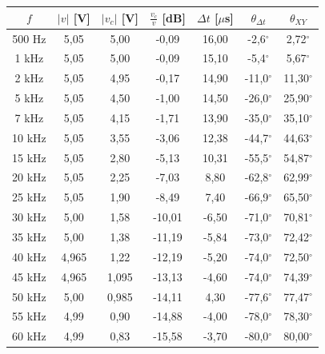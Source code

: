 \documentclass{article}
\begin{document}
\begin{table}[H]
                    \centering
                    \renewcommand{\arraystretch}{1.1}
                    \begin{tabular}{ccccccc}
                    \toprule
                    \textbf{$f$} & \textbf{$|v|$ [V]} & \textbf{$|v_c|$ [V]} & \textbf{$\frac{v_c}{v}$ [dB]} & \textbf{$\Delta t$ [$\mu$s]} & \textbf{$\theta_{\Delta t}$} & \textbf{$\theta_{XY}$} \\
                    \midrule
                    500 Hz & 5,05 & 5,00 & -0,09 & 16,00 & -2,6$^\circ$ & 2,72$^\circ$ \\
                    1 kHz  & 5,05 & 5,00 & -0,09 & 15,10 & -5,4$^\circ$ & 5,67$^\circ$ \\
                    2 kHz  & 5,05 & 4,95 & -0,17 & 14,90 & -11,0$^\circ$ & 11,30$^\circ$ \\
                    5 kHz  & 5,05 & 4,50 & -1,00 & 14,50 & -26,0$^\circ$ & 25,90$^\circ$ \\
                    7 kHz  & 5,05 & 4,15 & -1,71 & 13,90 & -35,0$^\circ$ & 35,10$^\circ$ \\
                    10 kHz & 5,05 & 3,55 & -3,06 & 12,38 & -44,7$^\circ$ & 44,63$^\circ$ \\
                    15 kHz & 5,05 & 2,80 & -5,13 & 10,31 & -55,5$^\circ$ & 54,87$^\circ$ \\
                    20 kHz & 5,05 & 2,25 & -7,03 & 8,80 & -62,8$^\circ$ & 62,99$^\circ$ \\
                    25 kHz & 5,05 & 1,90 & -8,49 & 7,40 & -66,9$^\circ$ & 65,50$^\circ$ \\
                    30 kHz & 5,00 & 1,58 & -10,01 & -6,50 & -71,0$^\circ$ & 70,81$^\circ$ \\
                    35 kHz & 5,00 & 1,38 & -11,19 & -5,84 & -73,0$^\circ$ & 72,42$^\circ$ \\
                    40 kHz & 4,965 & 1,22 & -12,19 & -5,20 & -74,0$^\circ$ & 72,50$^\circ$ \\
                    45 kHz & 4,965 & 1,095 & -13,13 & -4,60 & -74,0$^\circ$ & 74,39$^\circ$ \\
                    50 kHz & 5,00 & 0,985 & -14,11 & 4,30 & -77,6$^\circ$ & 77,47$^\circ$ \\
                    55 kHz & 4,99 & 0,90 & -14,88 & -4,00 & -78,0$^\circ$ & 78,30$^\circ$ \\
                    60 kHz & 4,99 & 0,83 & -15,58 & -3,70 & -80,0$^\circ$ & 80,00$^\circ$ \\

\end{tabular}
\end{table}
\end{document}
